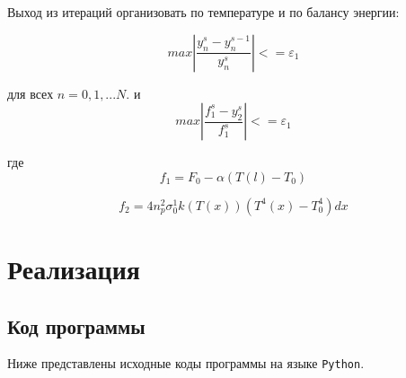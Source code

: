 Выход из итераций организовать по температуре и по балансу энергии:

\begin{equation*}
	max|\frac{y^s_n - y^{s-1}_n}{y^s_n}| <= \varepsilon_{1}
\end{equation*} 

\indent для всех $n = 0, 1, ... N.$ и \\

\begin{equation*}
	max|\frac{f^s_1 - y^s_2}{f^s_1}| <= \varepsilon_{1}
\end{equation*}

где \\

\begin{equation*}
	f_{1} = F_0 - \alpha(T(l) - T_{0})
\end{equation*}

\begin{equation*}
	f_{2}  = 4n^2_p \sigma ^1_0 k(T(x))(T^4(x) - T^4_0) dx
\end{equation*}

\chapter{Реализация}

\section{Код программы}

Ниже представлены исходные коды программы на языке \texttt{Python}.

